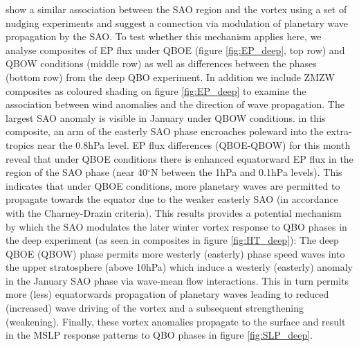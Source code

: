 \cite{grayForecasting2020} show a similar association between the SAO region and the vortex using a set of nudging experiments and suggest a connection via modulation of planetary wave propagation by the SAO. To test whether this mechanism applies here, we analyse composites of EP flux under QBOE (figure \ref{fig:EP_deep}, top row) and QBOW conditions (middle row) as well as differences between the phases (bottom row) from the deep QBO experiment. In addition we include ZMZW composites as coloured shading on figure \ref{fig:EP_deep} to examine the association between wind anomalies and the direction of wave propagation. The largest SAO anomaly is visible in January under QBOW conditions. in this composite, an arm of the easterly SAO phase encroaches poleward into the extra-tropics near the 0.8hPa level. EP flux differences (QBOE-QBOW) for this month reveal that under QBOE conditions there is enhanced equatorward EP flux in the region of the SAO phase (near 40$^\circ$N between the 1hPa and 0.1hPa levels). This indicates that under QBOE conditions, more planetary waves are permitted to propagate towards the equator due to the weaker easterly SAO (in accordance with the Charney-Drazin criteria). This results provides a potential mechanism by which the SAO modulates the later winter vortex response to QBO phases in the deep experiment (as seen in composites in figure \ref{fig:HT_deep}): The deep QBOE (QBOW) phase permits more westerly (easterly) phase speed waves into the upper stratosphere (above 10hPa) which induce a westerly (easterly) anomaly in the January SAO phase via wave-mean flow interactions. This in turn permits more (less) equatorwards propagation of planetary waves leading to reduced (increased) wave driving of the vortex and a subsequent strengthening (weakening). Finally, these vortex anomalies propagate to the surface and result in the MSLP response patterns to QBO phases in figure \ref{fig:SLP_deep}.

